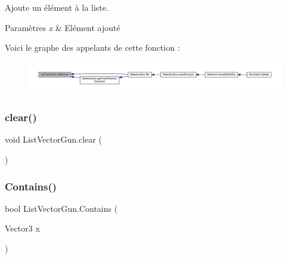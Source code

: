 Ajoute un élément à la liste. 


\begin{DoxyParams}{Paramètres}
{\em x} & Elément ajouté\\
\hline
\end{DoxyParams}
Voici le graphe des appelants de cette fonction \+:
\nopagebreak
\begin{figure}[H]
\begin{center}
\leavevmode
\includegraphics[width=350pt]{class_list_vector_gun_a9dc269fd17f18f6c9f4e974990c6e442_icgraph}
\end{center}
\end{figure}
\mbox{\label{class_list_vector_gun_ad89b2534e45d190049c9a922de5df655}} 
\subsubsection{\texorpdfstring{clear()}{clear()}}
{\footnotesize\ttfamily void List\+Vector\+Gun.\+clear (\begin{DoxyParamCaption}{ }\end{DoxyParamCaption})\hspace{0.3cm}{\ttfamily [inline]}}





\mbox{\label{class_list_vector_gun_afacf0a838223ed57e72abcc7c21594ae}} 
\subsubsection{\texorpdfstring{Contains()}{Contains()}\hspace{0.1cm}{\footnotesize\ttfamily [1/2]}}
{\footnotesize\ttfamily bool List\+Vector\+Gun.\+Contains (\begin{DoxyParamCaption}\item[{Vector3}]{x }\end{DoxyParamCaption})\hspace{0.3cm}{\ttfamily [inline]}}



